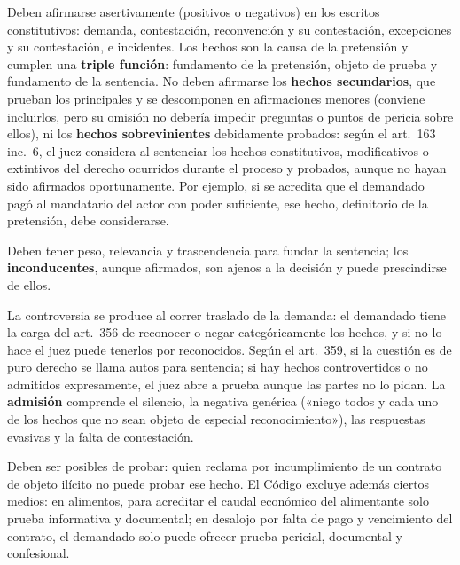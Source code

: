 \documentclass[12pt,oneside]{book}
\begin{document}
\begin{description}[leftmargin=0pt,style=nextline]
\item[Afirmados.] Deben afirmarse asertivamente (positivos o negativos) en los escritos constitutivos: demanda, contestación, reconvención y su contestación, excepciones y su contestación, e incidentes. Los hechos son la causa de la pretensión y cumplen una \textbf{triple función}: fundamento de la pretensión, objeto de prueba y fundamento de la sentencia. No deben afirmarse los \textbf{hechos secundarios}, que prueban los principales y se descomponen en afirmaciones menores (conviene incluirlos, pero su omisión no debería impedir preguntas o puntos de pericia sobre ellos), %
ni los \textbf{hechos sobrevinientes} debidamente probados: según el art.~163 inc.~6, el juez considera al sentenciar los hechos constitutivos, modificativos o extintivos del derecho ocurridos durante el proceso y probados, aunque no hayan sido afirmados oportunamente. Por ejemplo, si se acredita que el demandado pagó al mandatario del actor con poder suficiente, ese hecho, definitorio de la pretensión, debe considerarse.
\item[Conducentes.] Deben tener peso, relevancia y trascendencia para fundar la sentencia; los \textbf{inconducentes}, aunque afirmados, son ajenos a la decisión y puede prescindirse de ellos.
\item[Controvertidos.] La controversia se produce al correr traslado de la demanda: el demandado tiene la carga del art.~356 de reconocer o negar categóricamente los hechos, y si no lo hace el juez puede tenerlos por reconocidos. Según el art.~359, si la cuestión es de puro derecho se llama autos para sentencia; si hay hechos controvertidos o no admitidos expresamente, el juez abre a prueba aunque las partes no lo pidan. La \textbf{admisión} comprende el silencio, la negativa genérica («niego todos y cada uno de los hechos que no sean objeto de especial reconocimiento»), las respuestas evasivas y la falta de contestación.
\item[Admisibles.] Deben ser posibles de probar: quien reclama por incumplimiento de un contrato de objeto ilícito no puede probar ese hecho. El Código excluye además ciertos medios: en alimentos, para acreditar el caudal económico del alimentante solo prueba informativa y documental; en desalojo por falta de pago y vencimiento del contrato, el demandado solo puede ofrecer prueba pericial, documental y confesional.
\end{description}
\end{document}
